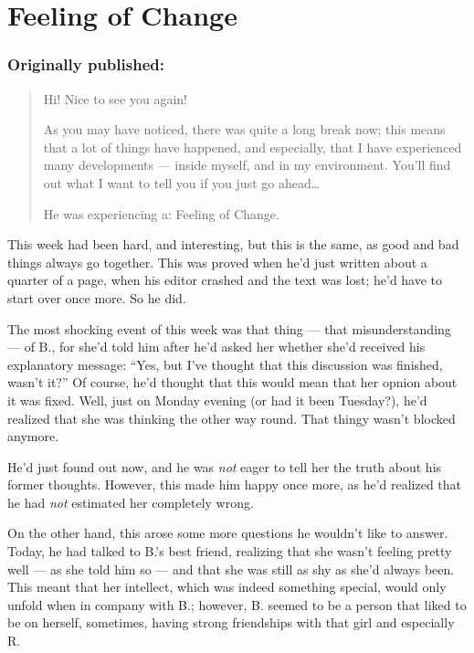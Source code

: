 \chapter{Feeling of Change}
\label{cha:feeling-of-change}
\subsection*{Originally published: }
\begin{quote}
Hi! Nice to see you again!

As you may have noticed, there was quite a long break now; this means that a lot of things have happened, and especially, that I have experienced many developments --- inside myself, and in my environment. You'll find out what I want to tell you if you just go ahead\dots{}

He was experiencing a: Feeling of Change.
\end{quote}

This week had been hard, and interesting, but this is the same, as good and bad things always go together. This was proved when he'd just written about a quarter of a page, when his editor crashed and the text was lost; he'd have to start over once more. So he did.

The most shocking event of this week was that thing --- that misunderstanding --- of B., for she'd told him after he'd asked her whether she'd received his explanatory message: \enquote{Yes, but I've thought that this discussion was finished, wasn't it?}
Of course, he'd thought that this would mean that her opnion about it was fixed. 
Well, just on Monday evening (or had it been Tuesday?), he'd realized that she was thinking the other way round. 
That thingy wasn't blocked anymore.

He'd just found out now, and he was \emph{not} eager to tell her the truth about his former thoughts. However, this made him happy once more, as he'd realized that he had \emph{not} estimated her completely wrong.

On the other hand, this arose some more questions he wouldn't like to answer. 
Today, he had talked to B.'s best friend, realizing that she wasn't feeling pretty well --- as she told him so --- and that she was still as shy as she'd always been. This meant that her intellect, which was indeed something special, would only unfold when in company with B.; however, B. seemed to be a person that liked to be on herself, sometimes, having strong friendships with that girl and especially R.

